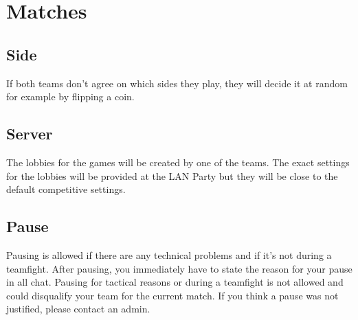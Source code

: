 \documentclass{article}
\begin{document}
	\section{Matches}
	\subsection{Side}
	If both teams don't agree on which sides they play, they will decide it at random for example by flipping a coin. 
	
	\subsection{Server}
	The lobbies for the games will be created by one of the teams. The exact settings for the lobbies will be provided at the LAN Party but they will be close to the default competitive settings. 
	
	\subsection{Pause}
	Pausing is allowed if there are any technical problems and if it's not during a teamfight. After pausing, you immediately have to state the reason for your pause in all chat. Pausing for tactical reasons or during a teamfight is not allowed and could disqualify your team for the current match. If you think a pause was not justified, please contact an admin.
\end{document}
